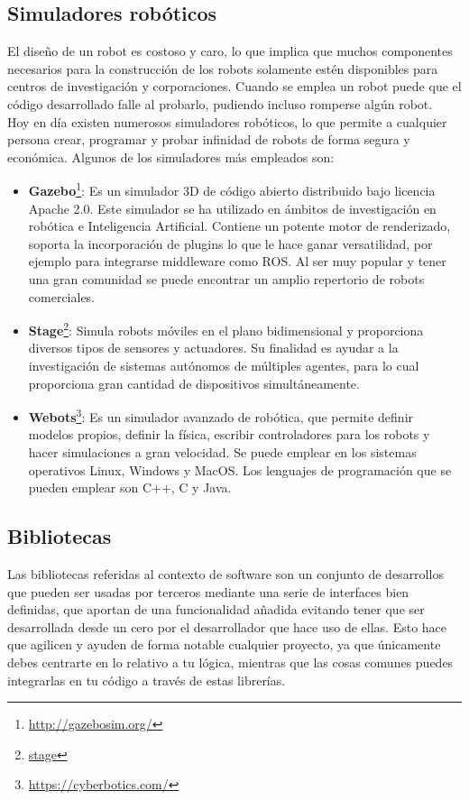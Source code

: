 \subsection{Simuladores robóticos}
El diseño de un robot es costoso y caro, lo que implica que muchos componentes necesarios para la construcción de los robots solamente estén disponibles para centros de investigación y corporaciones. Cuando se emplea un robot puede que el código desarrollado falle al probarlo, pudiendo incluso romperse algún robot.\\

Hoy en día existen numerosos simuladores robóticos, lo que permite a cualquier persona crear, programar y probar infinidad de robots de forma segura y económica. Algunos de los simuladores más empleados son:

\begin{itemize}
\item \textbf{Gazebo}\footnote{\url{http://gazebosim.org/}}: Es un simulador 3D de código abierto distribuido bajo licencia Apache 2.0. Este simulador se ha utilizado en ámbitos de investigación en robótica e Inteligencia Artificial. Contiene un potente motor de renderizado, soporta la incorporación de plugins lo que le hace ganar versatilidad, por ejemplo para integrarse middleware como ROS. Al ser muy popular y tener una gran comunidad se puede encontrar un amplio repertorio de robots comerciales.

\item \textbf{Stage}\footnote{\href{http://playerstage.sourceforge.net/index.php?src=stage}{stage}}: Simula robots móviles en el plano bidimensional y proporciona diversos tipos de sensores y actuadores. Su finalidad es ayudar a la investigación de sistemas autónomos de múltiples agentes, para lo cual proporciona gran cantidad de dispositivos simultáneamente.

\item \textbf{Webots}\footnote{\url{https://cyberbotics.com/}}: Es un simulador avanzado de robótica, que permite definir modelos propios, definir la física, escribir controladores para los robots y hacer simulaciones a gran velocidad. Se puede emplear en los sistemas operativos Linux, Windows y MacOS. Los lenguajes de programación que se pueden emplear son  C++, C y Java.
\end{itemize}

\subsection{Bibliotecas}
Las bibliotecas referidas al contexto de software son un conjunto de desarrollos que pueden ser usadas por terceros mediante una serie de interfaces bien definidas, que aportan de una funcionalidad añadida evitando tener que ser desarrollada desde un cero por el desarrollador que hace uso de ellas. Esto hace que agilicen y ayuden de forma notable cualquier proyecto, ya que únicamente debes centrarte en lo relativo a tu lógica, mientras que las cosas comunes puedes integrarlas en tu código a través de estas librerías.\\


